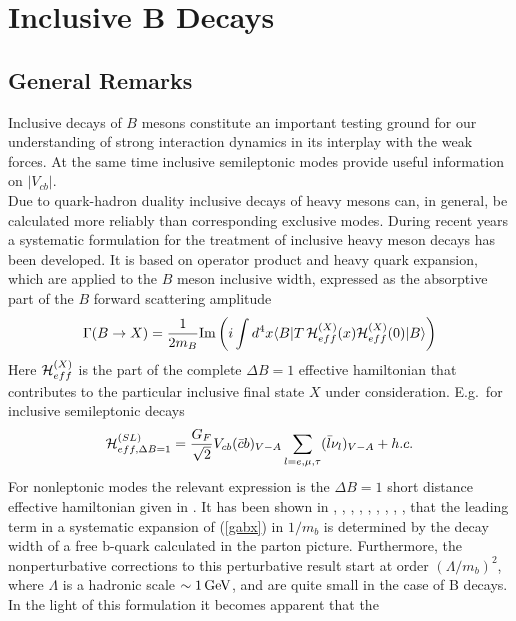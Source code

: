 \section{Inclusive B Decays}
\label{sec:InclB}
\subsection{General Remarks}
\label{sec:InclB:General}
Inclusive decays of $B$ mesons constitute an important testing ground
for our understanding of strong interaction dynamics in its interplay
with the weak forces. At the same time inclusive semileptonic modes
provide useful information on $|V_{cb}|$.
\\
Due to quark-hadron duality inclusive decays of heavy mesons can, in
general, be calculated more reliably than corresponding exclusive
modes. During recent years a systematic formulation for the treatment
of inclusive heavy meson decays has been developed. It is based on
operator product and heavy quark expansion, which are applied to the
$B$ meson inclusive width, expressed as the absorptive part of the $B$
forward scattering amplitude
\begin{equation}\label{gabx}
\Gamma(B\to X)=\frac{1}{2m_B}{{\rm Im}}\left(i \int d^4x
 \langle B | T \, {\cal H}^{(X)}_{eff}(x){\cal H}^{(X)}_{eff}(0) | B
\rangle\right)
\end{equation}
Here ${\cal H}^{(X)}_{eff}$ is the part of the complete $\Delta B=1$
effective hamiltonian that contributes to the particular inclusive
final state $X$ under consideration. E.g.\ for inclusive semileptonic decays
\begin{equation}\label{hbsl}
{\cal H}^{(SL)}_{eff,\Delta B=1}=\frac{G_F}{\sqrt{2}} V_{cb}
(\bar cb)_{V-A} \sum_{l=e,\mu,\tau}(\bar l\nu_l)_{V-A}+ h.c.
\end{equation}
For nonleptonic modes the relevant expression is the $\Delta B=1$ short
distance effective hamiltonian given in .  It has
been shown in \cite{Chay}, \cite{Bj}, \cite{bigietal:92},
\cite{bigietal:93}, \cite{manoharwise:94}, \cite{bloketal:94},
\cite{falketal:94}, \cite{mannel:94}, \cite{Bigi}, that the leading
term in a systematic expansion of (\ref{gabx}) in $1/m_b$ is determined
by the decay width of a free b-quark calculated in the parton picture.
Furthermore, the nonperturbative corrections to this perturbative
result start at order $(\Lambda/m_b)^2$, where $\Lambda$ is a hadronic
scale $\sim 1\, {\rm GeV}$, and are quite small in the case of B decays.  In
the light of this formulation it becomes apparent that the

